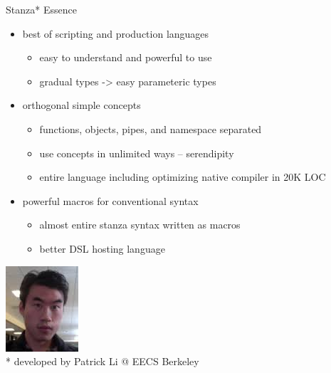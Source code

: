 \documentclass[xcolor=pdflatex,dvipsnames,table]{beamer}
\begin{document}
\begin{frame}[fragile]{Stanza* Essence}
\begin{itemize}
\item best of scripting and production languages
\begin{itemize}
\item easy to understand and powerful to use
\item gradual types -> easy parameteric types
\end{itemize}
\item orthogonal simple concepts
\begin{itemize}
\item functions, objects, pipes, and namespace separated
\item use concepts in unlimited ways -- serendipity
\item entire language including optimizing native compiler in 20K LOC
\end{itemize}
\item powerful macros for conventional syntax
\begin{itemize}
\item almost entire stanza syntax written as macros
\item better DSL hosting language
\end{itemize}
\end{itemize}
\vspace{0.25cm}
\begin{center}
\includegraphics[height=0.2\textheight]{figs/patrick.jpg} \\
* developed by Patrick Li @ EECS Berkeley
\end{center}
\end{frame}
\end{document}
